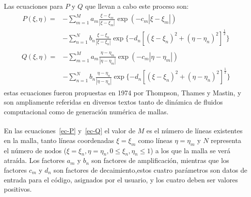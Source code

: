 \documentclass[letterpaper, openright, 12pt]{book}
\begin{document}
    \paragraph*{}
        Las ecuaciones para $P$ y $Q$ que llevan a cabo este proceso son:
        \begin{align}
            \begin{aligned}
                P(\xi, \eta) =& - \sum_{m = 1}^{M} a_{m} \frac{\xi - \xi_{m}}{|\xi - \xi_{m}|} \exp(-c_{m}|\xi - \xi_{m}|) \\&
                - \sum_{n=1}^{N} b_{n} \frac{\xi - \xi_{n}}{| \xi - \xi_{n} |} \exp\lbrace -d_{n} \left[ \left( \xi - \xi_{n} \right)^2 + \left( \eta - \eta_{n} \right)^2 \right]^\frac{1}{2} \rbrace
            \end{aligned}
            \label{ec-P}
        \end{align}
        \begin{align}
            \begin{aligned}
                Q(\xi, \eta) =& - \sum_{m = 1}^{M} a_{m} \frac{\eta - \eta_{m}}{|\eta - \eta_{m}|} \exp(-c_{m}|\eta - \eta_{m}|) \\&
                - \sum_{n=1}^{N} b_{n} \frac{\eta - \eta_{n}}{| \eta - \eta_{n} |} \exp\lbrace -d_{n} \left[ \left( \xi - \xi_{n} \right)^2 + \left( \eta - \eta_{n} \right)^2 \right]^\frac{1}{2} \rbrace
            \end{aligned}
            \label{ec-Q}
        \end{align}
        estas ecuaciones fueron propuestas en 1974 por Thompson, Thames y
        Mastin\cite{thompson1974automatic}, y son ampliamente referidas en
        diversos textos tanto de dinámica de fluidos computacional como de
        generación numérica de mallas.
    \paragraph*{}
        En las ecuaciones~\ref{ec-P} y~\ref{ec-Q} el valor de $M$ es el número
        de líneas existentes en la malla, tanto líneas coordenadas
        $\xi = \xi_{m}$ como líneas $\eta = \eta_{m}$ y $N$ representa el número
        de nodos ($\xi = \xi_{n}, \eta = \eta_{n}, 0 \leq \xi_{n}, \eta_{n} \leq 1$)
        a los que la malla se verá atraída. Los factores $a_{m}$ y $b_{n}$ son
        factores de amplificación, mientras que los factores $c_{m}$ y $d_{n}$
        son factores de decaimiento,estos cuatro parámetros son datos de entrada
        para el código, asignados por el usuario, y los cuatro deben ser valores
        positivos.
\end{document}
